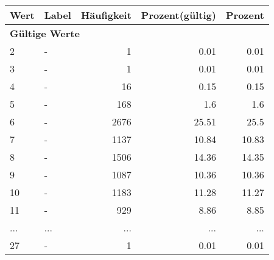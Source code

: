      \begin{longtable}{lXrrr}
     \toprule
     \textbf{Wert} & \textbf{Label} & \textbf{Häufigkeit} & \textbf{Prozent(gültig)} & \textbf{Prozent} \\
     \endhead
     \midrule
     \multicolumn{5}{l}{\textbf{Gültige Werte}}\\
        2 & \multicolumn{1}{X}{-} & %
          \num{1} &
          \num[round-mode=places,round-precision=2]{0,01} &
          \num[round-mode=places,round-precision=2]{0,01} \\
        3 & \multicolumn{1}{X}{-} & %
          \num{1} &
          \num[round-mode=places,round-precision=2]{0,01} &
          \num[round-mode=places,round-precision=2]{0,01} \\
        4 & \multicolumn{1}{X}{-} & %
          \num{16} &
          \num[round-mode=places,round-precision=2]{0,15} &
          \num[round-mode=places,round-precision=2]{0,15} \\
        5 & \multicolumn{1}{X}{-} & %
          \num{168} &
          \num[round-mode=places,round-precision=2]{1,6} &
          \num[round-mode=places,round-precision=2]{1,6} \\
        6 & \multicolumn{1}{X}{-} & %
          \num{2676} &
          \num[round-mode=places,round-precision=2]{25,51} &
          \num[round-mode=places,round-precision=2]{25,5} \\
        7 & \multicolumn{1}{X}{-} & %
          \num{1137} &
          \num[round-mode=places,round-precision=2]{10,84} &
          \num[round-mode=places,round-precision=2]{10,83} \\
        8 & \multicolumn{1}{X}{-} & %
          \num{1506} &
          \num[round-mode=places,round-precision=2]{14,36} &
          \num[round-mode=places,round-precision=2]{14,35} \\
        9 & \multicolumn{1}{X}{-} & %
          \num{1087} &
          \num[round-mode=places,round-precision=2]{10,36} &
          \num[round-mode=places,round-precision=2]{10,36} \\
        10 & \multicolumn{1}{X}{-} & %
          \num{1183} &
          \num[round-mode=places,round-precision=2]{11,28} &
          \num[round-mode=places,round-precision=2]{11,27} \\
        11 & \multicolumn{1}{X}{-} & %
          \num{929} &
          \num[round-mode=places,round-precision=2]{8,86} &
          \num[round-mode=places,round-precision=2]{8,85} \\
       ... & ... & ... & ... & ... \\
        27 & \multicolumn{1}{X}{-} & %
          \num{1} &
          \num[round-mode=places,round-precision=2]{0,01} &
          \num[round-mode=places,round-precision=2]{0,01} \\


\end{longtable}
